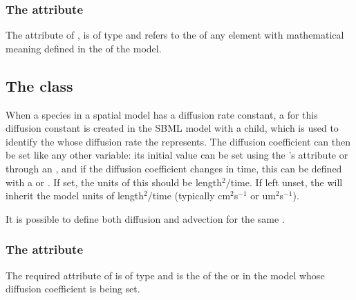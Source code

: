 \subsubsection{The \fixttspace{} attribute}
The  attribute of \SpatialSymbolReference, is of type  and refers to the  of any element with mathematical meaning defined in the \Geometry of the model.

\subsection{The  class}
\label{diffusioncoefficient-class}
When a species in a spatial model has a diffusion rate constant, a \Parameter for this diffusion constant is created in the SBML model with a \DiffusionCoefficient child, which is used to identify the \Species whose diffusion rate the \Parameter represents. The diffusion coefficient can then be set like any other variable:  its initial value can be set using the \Parameter's  attribute or through an \InitialAssignment, and if the diffusion coefficient changes in time, this can be defined with a \Rule or \Event. If set, the units of this \Parameter should be length$^2$/time.  If left unset, the \DiffusionCoefficient will inherit the model units of length$^2$/time (typically cm$^2$s$^{-1}$ or um$^2$s$^{-1}$).


It is possible to define both diffusion and advection for the same \Species.

\subsubsection{The \fixttspace{} attribute}
The required  attribute of \DiffusionCoefficient is of type  and is the  of the \Species or \Parameter in the model whose diffusion coefficient is being set.

